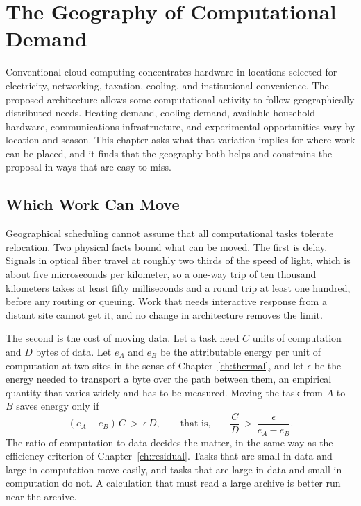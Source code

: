 \chapter{The Geography of Computational Demand}
\label{ch:geography}

Conventional cloud computing concentrates hardware in locations selected for electricity, networking, taxation, cooling, and institutional convenience. The proposed architecture allows some computational activity to follow geographically distributed needs. Heating demand, cooling demand, available household hardware, communications infrastructure, and experimental opportunities vary by location and season. This chapter asks what that variation implies for where work can be placed, and it finds that the geography both helps and constrains the proposal in ways that are easy to miss.

\section{Which Work Can Move}

Geographical scheduling cannot assume that all computational tasks tolerate relocation. Two physical facts bound what can be moved. The first is delay. Signals in optical fiber travel at roughly two thirds of the speed of light, which is about five microseconds per kilometer, so a one-way trip of ten thousand kilometers takes at least fifty milliseconds and a round trip at least one hundred, before any routing or queuing. Work that needs interactive response from a distant site cannot get it, and no change in architecture removes the limit.

The second is the cost of moving data. Let a task need $C$ units of computation and $D$ bytes of data. Let $e_A$ and $e_B$ be the attributable energy per unit of computation at two sites in the sense of Chapter~\ref{ch:thermal}, and let $\epsilon$ be the energy needed to transport a byte over the path between them, an empirical quantity that varies widely and has to be measured. Moving the task from $A$ to $B$ saves energy only if
\[
(e_A-e_B)\,C\ >\ \epsilon\,D,
\qquad\text{that is,}\qquad
\frac{C}{D}\ >\ \frac{\epsilon}{e_A-e_B}.
\]
The ratio of computation to data decides the matter, in the same way as the efficiency criterion of Chapter~\ref{ch:residual}. Tasks that are small in data and large in computation move easily, and tasks that are large in data and small in computation do not. A calculation that must read a large archive is better run near the archive.

